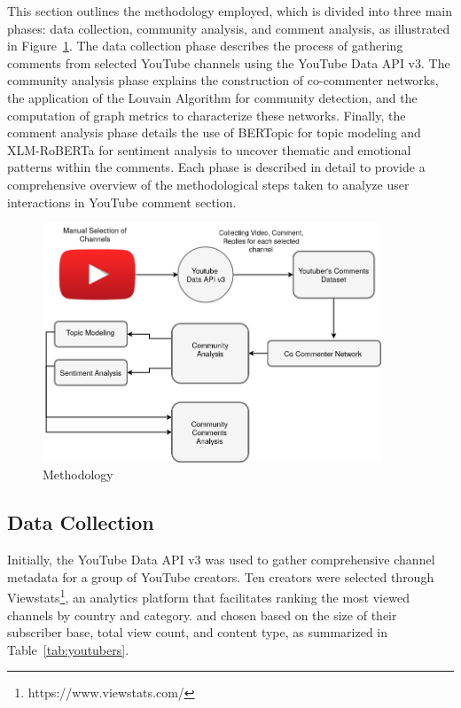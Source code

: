 \documentclass[sigconf]{acmart}
\begin{document}
This section outlines the methodology employed, which is divided into three main phases: 
data collection, community analysis, and comment analysis, as illustrated in Figure~\ref{fig:methodology}. 
The data collection phase describes the process of gathering comments from selected YouTube channels 
using the YouTube Data API v3. The community analysis phase explains the construction of co-commenter 
networks, the application of the Louvain Algorithm for community detection, and the computation of 
graph metrics to characterize these networks. Finally, the comment analysis phase details the use of 
BERTopic for topic modeling and XLM-RoBERTa for sentiment analysis to uncover thematic and emotional 
patterns within the comments. Each phase is described in detail to provide a comprehensive overview 
of the methodological steps taken to analyze user interactions in YouTube comment section.

\begin{figure}[t!]
    \centering
    \includegraphics[keepaspectratio,width=0.9\textwidth]{./imgs/tcc_methodology.png}
    \caption{Methodology}
    \label{fig:methodology}
\end{figure}

\subsection{Data Collection}

Initially, the YouTube Data API v3 was used to gather comprehensive channel metadata for a group of YouTube creators. 
Ten creators were selected through Viewstats\footnote{https://www.viewstats.com/}, an analytics platform 
that facilitates ranking the most viewed channels by country and category.
and chosen based on the size of their subscriber base, total view count, and content type, as summarized in 
Table~\ref{tab:youtubers}.
\end{document}
